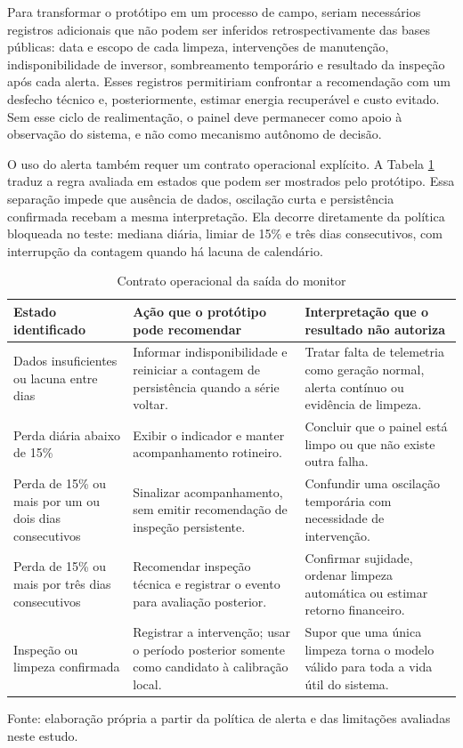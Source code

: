 \documentclass{UNESC}
\begin{document}
Para transformar o protótipo em um processo de campo, seriam necessários registros adicionais que não podem ser inferidos retrospectivamente das bases públicas: data e escopo de cada limpeza, intervenções de manutenção, indisponibilidade de inversor, sombreamento temporário e resultado da inspeção após cada alerta. Esses registros permitiriam confrontar a recomendação com um desfecho técnico e, posteriormente, estimar energia recuperável e custo evitado. Sem esse ciclo de realimentação, o painel deve permanecer como apoio à observação do sistema, e não como mecanismo autônomo de decisão.

O uso do alerta também requer um contrato operacional explícito. A Tabela \ref{tab:contrato-alerta} traduz a regra avaliada em estados que podem ser mostrados pelo protótipo. Essa separação impede que ausência de dados, oscilação curta e persistência confirmada recebam a mesma interpretação. Ela decorre diretamente da política bloqueada no teste: mediana diária, limiar de 15\% e três dias consecutivos, com interrupção da contagem quando há lacuna de calendário.

\begin{table}[htbp]
\centering
\caption{Contrato operacional da saída do monitor}
\label{tab:contrato-alerta}
\small
\begin{tabularx}{\linewidth}{@{}>{\raggedright\arraybackslash}p{2.9cm}>{\raggedright\arraybackslash}X>{\raggedright\arraybackslash}X@{}}
\toprule
Estado identificado & Ação que o protótipo pode recomendar & Interpretação que o resultado não autoriza \\
\midrule
Dados insuficientes ou lacuna entre dias & Informar indisponibilidade e reiniciar a contagem de persistência quando a série voltar. & Tratar falta de telemetria como geração normal, alerta contínuo ou evidência de limpeza. \\
Perda diária abaixo de 15\% & Exibir o indicador e manter acompanhamento rotineiro. & Concluir que o painel está limpo ou que não existe outra falha. \\
Perda de 15\% ou mais por um ou dois dias consecutivos & Sinalizar acompanhamento, sem emitir recomendação de inspeção persistente. & Confundir uma oscilação temporária com necessidade de intervenção. \\
Perda de 15\% ou mais por três dias consecutivos & Recomendar inspeção técnica e registrar o evento para avaliação posterior. & Confirmar sujidade, ordenar limpeza automática ou estimar retorno financeiro. \\
Inspeção ou limpeza confirmada & Registrar a intervenção; usar o período posterior somente como candidato à calibração local. & Supor que uma única limpeza torna o modelo válido para toda a vida útil do sistema. \\
\bottomrule
\end{tabularx}
\par\smallskip\raggedright\footnotesize Fonte: elaboração própria a partir da política de alerta e das limitações avaliadas neste estudo.
\end{table}
\end{document}
